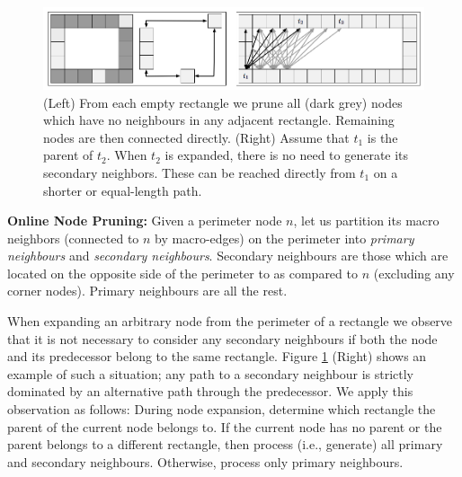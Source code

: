 \begin{figure}[t]
	\begin{center}
	\includegraphics[width=0.97\columnwidth, trim = 10mm 10mm 10mm 0mm]
	{diagrams/branching_wide.png}
	\end{center}
	\vspace{-3pt}
	\caption{(Left) From each empty rectangle we prune all (dark grey) nodes which
	have no neighbours in any adjacent rectangle.
	Remaining nodes are then connected directly.
	(Right) Assume that $t_{1}$ is the parent of $t_2$. When $t_2$
	is expanded, there is no need to generate its secondary neighbors.
	These can be reached directly from $t_1$ on a shorter or equal-length path.
}
\label{fig-branching}
\end{figure}

\noindent
\textbf{Online Node Pruning:}
Given a perimeter node $n$, let us partition its macro neighbors 
(connected to $n$ by macro-edges)
on the perimeter into 
\emph{primary neighbours} and \emph{secondary neighbours}.  Secondary neighbours are those
which are located on the opposite side of the perimeter to as compared to $n$
(excluding any corner nodes).  Primary neighbours are all the rest.

When expanding an arbitrary node from the perimeter of a rectangle we observe
that it is not necessary to consider any secondary neighbours if both the node
and its predecessor belong to the same rectangle. Figure \ref{fig-branching}
(Right) shows an example of such a situation; any path to a secondary neighbour
is strictly dominated by an alternative path through the predecessor. 
We apply this observation as follows: {During
node expansion, determine which rectangle the parent of the current node belongs
to.} {If the current node has no parent or the parent belongs to a different
rectangle, then process (i.e., generate) all primary and secondary neighbours.
Otherwise, process only primary neighbours.}

